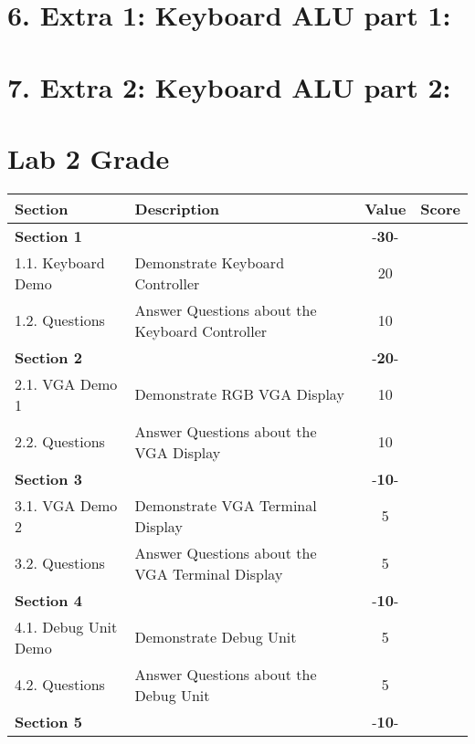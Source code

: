\documentclass{article}
\begin{document}
\section{6. Extra 1: Keyboard ALU part 1:}


\newpage

\section{7. Extra 2: Keyboard ALU part 2:}

\newpage

\section{Lab 2 Grade}

\begin{table}[!htb]
  \begin{center}
    \begin{tabular}[width=0.8\textwidth]{|l|l|c|l|}
       \hline
       Section & Description & Value & Score\\
       \hline 
       \multicolumn{2}{|l}{\textbf{Section 1}}  & -\textbf{30}- &\\
       \hline
       1.1. Keyboard Demo & Demonstrate Keyboard Controller & 20 &\\
       1.2. Questions & Answer Questions about the Keyboard Controller & 10 &\\
       \hline
       \multicolumn{2}{|l}{\textbf{Section 2}}  & -\textbf{20}- &\\
       \hline
       2.1. VGA Demo 1 & Demonstrate RGB VGA Display & 10 &\\
       2.2. Questions & Answer Questions about the VGA Display & 10 &\\
       \hline
       \multicolumn{2}{|l}{\textbf{Section 3}}  & -\textbf{10}- &\\
       \hline
       3.1. VGA Demo 2 & Demonstrate VGA Terminal Display & 5 &\\
       3.2. Questions & Answer Questions about the VGA Terminal Display & 5 &\\
       \hline
       \multicolumn{2}{|l}{\textbf{Section 4}}  & -\textbf{10}- &\\
       \hline
       4.1. Debug Unit Demo &  Demonstrate Debug Unit & 5 &\\
       4.2. Questions & Answer Questions about the Debug Unit & 5 &\\
       \hline
       \multicolumn{2}{|l}{\textbf{Section 5}}  & -\textbf{10}- &\\

\end{tabular}
\end{center}
\end{table}
\end{document}
